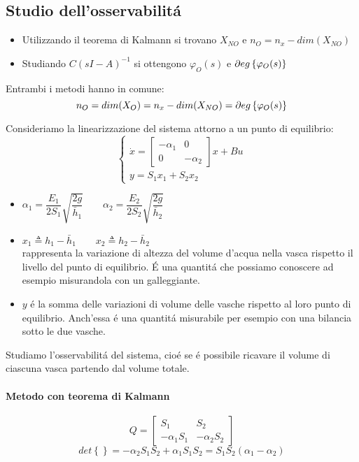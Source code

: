 \documentclass[../main.tex]{subfiles}
\begin{document}
	\subsection{Studio dell'osservabilit\'a}
		\begin{itemize}
			\item 
				Utilizzando il teorema di Kalmann si trovano $ X_{NO} $ e $ n_O = n_x - dim(X_{NO}) $
			\item 
				Studiando $ C(sI-A)^{-1} $ si ottengono $ \varphi_O(s) $ e $ \partial eg \left\lbrace \varphi_O(s) \right\rbrace $
		\end{itemize}
		Entrambi i metodi hanno in comune:
		\[
			n_O = dim(X_O) = n_x - dim(X_{NO}) = \partial eg \left\lbrace \varphi_O(s) \right\rbrace
		\]
		
		\begin{Exercise}[title={Studiare l'osservabilit\'a di due vasche in parallelo}]
			Consideriamo la linearizzazione del sistema attorno a un punto di equilibrio:
			\[
				\begin{cases}
					\dot x=
					\begin{bmatrix}
						-\alpha_1 & 0\\
						0 & -\alpha_2
					\end{bmatrix} x + Bu	
					\\
					y = S_1 x_1 + S_2 x_2
				\end{cases}
			\]
			\begin{itemize}
				\item 
					$ \alpha_1 = \dfrac{E_1}{2S_1} \sqrt{\dfrac{2g}{\bar h_1}} \qquad \alpha_2 = \dfrac{E_2}{2S_2} \sqrt{\dfrac{2g}{\bar h_2}} $ 
				\item 
					$ x_1 \triangleq h_1 - \bar h_1 \qquad x_2 \triangleq h_2 - \bar h_2 $\\
					rappresenta la variazione di altezza del volume d'acqua nella vasca rispetto il livello del punto di equilibrio. \'E una quantit\'a che possiamo conoscere ad esempio misurandola con un galleggiante.
				\item 
					$ y $ \'e la somma delle variazioni di volume delle vasche rispetto al loro punto di equilibrio. Anch'essa \'e una quantit\'a misurabile per esempio con una bilancia sotto le due vasche. 
			\end{itemize}
		
			Studiamo l'osservabilit\'a del sistema, cio\'e se \'e possibile ricavare il volume di ciascuna vasca partendo dal volume totale.
			
			\paragraph{Metodo con teorema di Kalmann}
				\[
					Q =
					\begin{bmatrix}
						S_1 & S_2\\
						-\alpha_1 S_1 & -\alpha_2 S_2
					\end{bmatrix}
				\]
				\[
					det\left\lbrace \right\rbrace = -\alpha_2 S_1 S_2 + \alpha_1 S_1 S_2 = S_1 S_2 (\alpha_1 - \alpha_2)
				\]
				

\end{Exercise}
\end{document}

